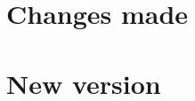 \documentclass{article}
\begin{document}

\section*{Changes made}

\section*{New version}

\end{document}
